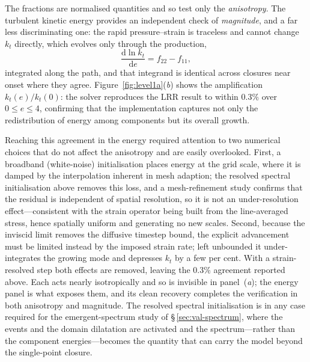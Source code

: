 \documentclass[lineno]{JFM-FLM_Au}
\begin{document}
The fractions are normalised quantities and so test only the
\emph{anisotropy}. The turbulent kinetic energy provides an independent
check of \emph{magnitude}, and a far less discriminating one: the rapid
pressure--strain is traceless and cannot change $k_t$ directly, which
evolves only through the production,
\begin{equation}
  \frac{\mathrm{d}\ln k_t}{\mathrm{d}e} = f_{22} - f_{11},
  \label{eq:dlnkt}
\end{equation}
integrated along the path, and that integrand is identical
across closures near onset where they agree.
Figure~\ref{fig:level1a}(\textit{b}) shows the amplification
$k_t(e)/k_t(0)$: the solver reproduces the LRR result to within $0.3\%$ over
$0\le e\le4$, confirming that the implementation captures not only the
redistribution of energy among components but its overall growth.

Reaching this agreement in the energy required attention to two numerical
choices that do not affect the anisotropy and are easily overlooked. First,
a broadband (white-noise) initialisation places energy at the grid scale,
where it is damped by the interpolation inherent in mesh adaption; the
resolved spectral initialisation above removes this loss, and a
mesh-refinement study confirms that the residual is independent of spatial
resolution, so it is not an under-resolution effect---consistent with the
strain operator being built from the line-averaged stress, hence spatially
uniform and generating no new scales. Second, because the inviscid limit
removes the diffusive timestep bound, the explicit advancement must be
limited instead by the imposed strain rate; left unbounded it
under-integrates the growing mode and depresses $k_t$ by a few per cent.
With a strain-resolved step both effects are removed, leaving the $0.3\%$
agreement reported above. Each acts nearly isotropically and so is invisible
in panel~(\textit{a}); the energy panel is what exposes them, and its clean
recovery completes the verification in both anisotropy and magnitude. The
resolved spectral initialisation is in any case required for the
emergent-spectrum study of \S\,\ref{sec:val-spectrum}, where the events and
the domain dilatation are activated and the spectrum---rather than the
component energies---becomes the quantity that can carry the model beyond the
single-point closure.
\end{document}
